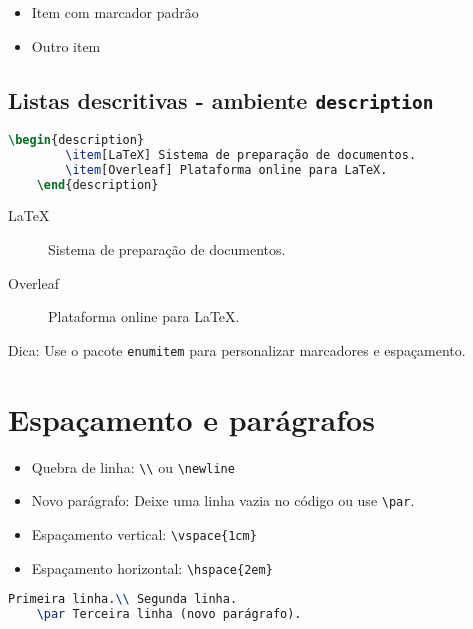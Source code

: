 \begin{itemize}
    \item Item com marcador padrão
    \item Outro item
\end{itemize}

\subsection{Listas descritivas - ambiente \texttt{description}}

\begin{lstlisting}[language=tex, caption=Listas descritivas]
    \begin{description}
        \item[LaTeX] Sistema de preparação de documentos.
        \item[Overleaf] Plataforma online para LaTeX.
    \end{description}
\end{lstlisting}

\begin{description}
    \item[LaTeX] Sistema de preparação de documentos.
    \item[Overleaf] Plataforma online para LaTeX.
\end{description}

Dica: Use o pacote \verb|enumitem| para personalizar marcadores e espaçamento.

\section{Espaçamento e parágrafos}
\begin{itemize}
    \item Quebra de linha: \verb|\\| ou \verb|\newline|
    \item Novo parágrafo: Deixe uma linha vazia no código ou use \verb|\par|.
    \item Espaçamento vertical: \verb|\vspace{1cm}|
    \item Espaçamento horizontal: \verb|\hspace{2em}|
\end{itemize}

\begin{lstlisting}[language=tex, caption=Exemplo de espaçamento e parágrafos]
    Primeira linha.\\ Segunda linha.  
    \par Terceira linha (novo parágrafo).
\end{lstlisting}

